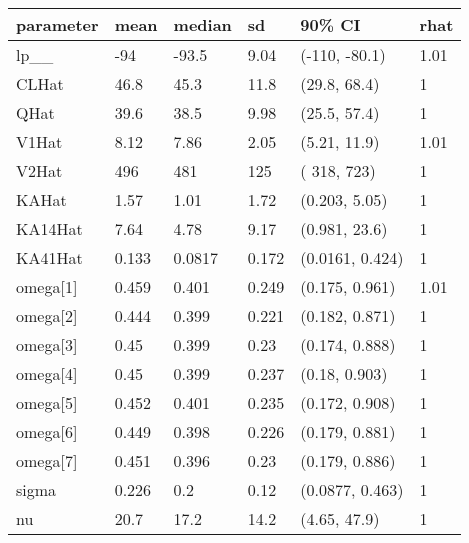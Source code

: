 
\begin{tabular}{l|l|l|l|l|l}
\hline
parameter & mean & median & sd & 90\% CI & rhat\\
\hline
lp\_\_ & -94 & -93.5 & 9.04 & (-110, -80.1) & 1.01\\
\hline
CLHat & 46.8 & 45.3 & 11.8 & (29.8, 68.4) & 1\\
\hline
QHat & 39.6 & 38.5 & 9.98 & (25.5, 57.4) & 1\\
\hline
V1Hat & 8.12 & 7.86 & 2.05 & (5.21, 11.9) & 1.01\\
\hline
V2Hat & 496 & 481 & 125 & ( 318,  723) & 1\\
\hline
KAHat & 1.57 & 1.01 & 1.72 & (0.203, 5.05) & 1\\
\hline
KA14Hat & 7.64 & 4.78 & 9.17 & (0.981, 23.6) & 1\\
\hline
KA41Hat & 0.133 & 0.0817 & 0.172 & (0.0161, 0.424) & 1\\
\hline
omega[1] & 0.459 & 0.401 & 0.249 & (0.175, 0.961) & 1.01\\
\hline
omega[2] & 0.444 & 0.399 & 0.221 & (0.182, 0.871) & 1\\
\hline
omega[3] & 0.45 & 0.399 & 0.23 & (0.174, 0.888) & 1\\
\hline
omega[4] & 0.45 & 0.399 & 0.237 & (0.18, 0.903) & 1\\
\hline
omega[5] & 0.452 & 0.401 & 0.235 & (0.172, 0.908) & 1\\
\hline
omega[6] & 0.449 & 0.398 & 0.226 & (0.179, 0.881) & 1\\
\hline
omega[7] & 0.451 & 0.396 & 0.23 & (0.179, 0.886) & 1\\
\hline
sigma & 0.226 & 0.2 & 0.12 & (0.0877, 0.463) & 1\\
\hline
nu & 20.7 & 17.2 & 14.2 & (4.65, 47.9) & 1\\
\hline
\end{tabular}

